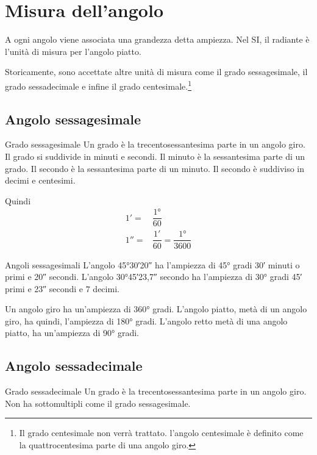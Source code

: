 \section{Misura dell'angolo}
\label{sec:MisuraAngoloGonio}
A ogni angolo viene associata una grandezza detta ampiezza. Nel SI, il radiante è l'unità di misura per l'angolo piatto.

Storicamente, sono accettate altre unità di misura come il grado sessagesimale, il grado sessadecimale  e infine il grado centesimale.\footnote{Il grado centesimale non verrà trattato. l'angolo centesimale è definito come la quattrocentesima parte di una angolo giro.}
\subsection{Angolo sessagesimale}
\begin{definizionet}{Grado sessagesimale}{}
	Un grado è la trecentosessantesima parte in un angolo giro. Il grado si suddivide in minuti e secondi. Il minuto è la sessantesima parte di un grado. Il secondo è la sessantesima parte di un minuto. Il secondo è suddiviso in decimi e centesimi.
\end{definizionet}
Quindi
\begin{align*}
\ang{;1;}=&\dfrac{\ang{1}}{60}\\
\ang{;;1}=&\dfrac{\ang{;1;}}{60}=\dfrac{\ang{1}}{3600}
\end{align*}
\begin{esempiot}{Angoli sessagesimali}{}
	L'angolo \ang{45;30;20} ha l'ampiezza di \ang{45} gradi \ang{;30;} minuti o primi e \ang{;;20} secondi. L'angolo \ang{30;45;23,7} secondo ha l'ampiezza di \ang{30} gradi \ang{;45;} primi e \ang{;;23} secondi e $7$ decimi.
\end{esempiot}
Un angolo giro ha un'ampiezza di \ang{360} gradi. L'angolo piatto, metà di un angolo giro, ha quindi, l'ampiezza di \ang{180} gradi. L'angolo retto metà di una angolo piatto, ha un'ampiezza di \ang{90} gradi.
\subsection{Angolo sessadecimale}
\begin{definizionet}{Grado sessadecimale}{}
	Un grado è la trecentosessantesima parte in un angolo giro. Non ha sottomultipli come il grado sessagesimale.
\end{definizionet}

